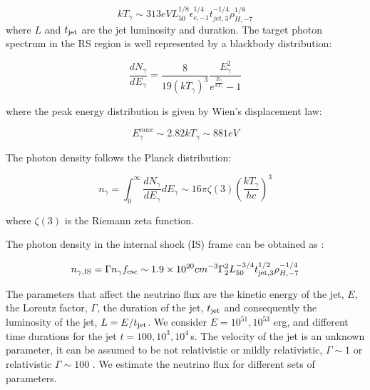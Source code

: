 \documentclass[twocolumn]{aastex631}
\begin{document}
\begin{equation}
    k T_{\gamma} \sim 313 eV L_{50}^{1/8} \epsilon_{e,-1}^{1/4} t_{jet,3}^{-1/4} \rho_{H,-7}^{1/8}
\end{equation}
where $L$ and $t_{\rm jet}$ are the jet luminosity and duration.
The target photon spectrum  in the RS region is well represented by a blackbody distribution:

\begin{equation}
    \frac{dN_{\gamma}}{dE_{\gamma}}= \frac{8}{19(k T_{\gamma})^3} \frac{E_{\gamma}^2}{e^{\frac{E_\gamma}{k T_\gamma}}-1}
\end{equation}

where the peak energy distribution is given by Wien's displacement law:

\begin{equation}
    E_{\gamma}^{max} \sim 2.82 k T_{\gamma} \sim 881 eV
\end{equation}

The photon density  follows the Planck distribution:

\begin{equation}
    n_{\gamma}= \int_0^\infty \frac{dN_{\gamma}}{dE_{\gamma}} dE_{\gamma} \sim 16 \pi \zeta(3) (\frac{kT_{\gamma}}{h c})^3
\end{equation}

\noindent

where $\zeta(3)$ is the Riemann zeta function.



The photon density in the internal shock (IS) frame can be obtained as \cite{Fasano2021}:

\begin{equation}
 n_{\gamma,\rm IS}= \Gamma n_{\gamma} f_{\rm esc} \sim 1.9 \times 10^{20} cm^{-3} \Gamma ^2_2 L^{-3/4}_{50} t^{1/2}_{\rm jet,3} \rho^{-1/4}_{H,-7}
\end{equation}

The parameters that affect the neutrino flux are the kinetic energy of the jet, $E$, the Lorentz factor, $\Gamma$, the duration of the jet, $t_{\rm jet}$ and consequently the luminosity of the jet, $L=E/t_{\rm jet}$.  
We consider $E=10^{51},10^{53}$ erg, and different time durations for the jet \citep{He2018} $t=100,10^3, 10^{4}$\,s. 
The velocity of the jet is an unknown parameter, it can be assumed to be  not relativistic or mildly relativistic, $\Gamma\sim 1$ \citep{Izzo2019,Soker22} or relativistic $\Gamma\sim 100$ \citep{Fasano2021}. 
We estimate the neutrino flux for different sets of parameters.
\end{document}
